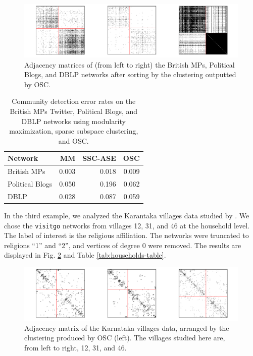 \documentclass[12pt]{article}
\begin{document}
\begin{figure}[H]

{\centering \includegraphics{summary_files/figure-latex/mp-1}

}

\caption{Adjacency matrices of (from left to right) the British MPs, Political Blogs, and DBLP networks after sorting by the clustering outputted by OSC.}\label{fig:mp}
\end{figure}

\begin{table}

\caption{\label{tab:unnamed-chunk-6}Community detection error rates on the British MPs Twitter, Political Blogs, and DBLP networks using modularity maximization, sparse subspace clustering, and OSC.}
\centering
\begin{tabular}[t]{l|r|r|r}
\hline
Network & MM & SSC-ASE & OSC\\
\hline
British MPs & 0.003 & 0.018 & 0.009\\
\hline
Political Blogs & 0.050 & 0.196 & 0.062\\
\hline
DBLP & 0.028 & 0.087 & 0.059\\
\hline
\end{tabular}
\end{table}

In the third example, we analyzed the Karantaka villages data studied by
\citet{DVN/U3BIHX_2013}. We chose the \texttt{visitgo}
networks from villages 12, 31, and 46 at the household level. The label
of interest is the religious affiliation. The networks were truncated to
religions ``1'' and ``2'', and vertices of degree 0 were removed. 
The results are displayed in Fig. \ref{fig:households-figure} and 
Table \ref{tab:households-table}.

\begin{figure}[H]

{\centering \includegraphics{summary_files/figure-latex/unnamed-chunk-7-1}

}

\caption{Adjacency matrix of the Karnataka villages data, arranged by the clustering produced by OSC (left). The villages studied here are, from left to right, 12, 31, and 46.}\label{fig:households-figure}
\end{figure}
\end{document}

